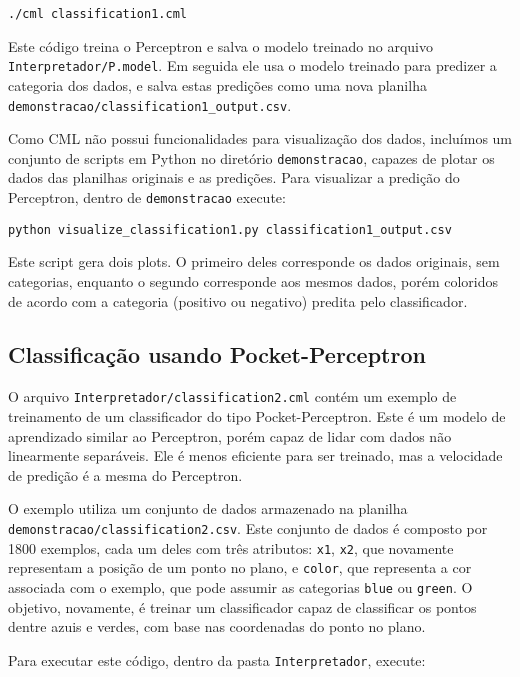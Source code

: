 \documentclass[12pt]{article}
\begin{document}
\begin{verbatim}
./cml classification1.cml
\end{verbatim}

Este código treina o Perceptron e salva o modelo treinado no arquivo \texttt{Interpretador/P.model}. Em seguida ele usa o modelo treinado para predizer a categoria dos dados, e salva estas predições como uma nova planilha \texttt{demonstracao/classification1\_output.csv}.

Como CML não possui funcionalidades para visualização dos dados, incluímos um conjunto de scripts em Python no diretório \texttt{demonstracao}, capazes de plotar os dados das planilhas originais e as predições. Para visualizar a predição do Perceptron, dentro de \texttt{demonstracao} execute:

\begin{verbatim}
python visualize_classification1.py classification1_output.csv
\end{verbatim}

Este script gera dois plots. O primeiro deles corresponde os dados originais, sem categorias, enquanto o segundo corresponde aos mesmos dados, porém coloridos de acordo com a categoria (positivo ou negativo) predita pelo classificador.

\subsection{Classificação usando Pocket-Perceptron}

O arquivo \texttt{Interpretador/classification2.cml} contém um exemplo de treinamento de um classificador do tipo Pocket-Perceptron. Este é um modelo de aprendizado similar ao Perceptron, porém capaz de lidar com dados não linearmente separáveis. Ele é menos eficiente para ser treinado, mas a velocidade de predição é a mesma do Perceptron.

O exemplo utiliza um conjunto de dados armazenado na planilha\\ \texttt{demonstracao/classification2.csv}. Este conjunto de dados é composto por 1800 exemplos, cada um deles com três atributos: \texttt{x1}, \texttt{x2}, que novamente representam a posição de um ponto no plano, e \texttt{color}, que representa a cor associada com o exemplo, que pode assumir as categorias \texttt{blue} ou \texttt{green}. O objetivo, novamente, é treinar um classificador capaz de classificar os pontos dentre azuis e verdes, com base nas coordenadas do ponto no plano. 

Para executar este código, dentro da pasta \texttt{Interpretador}, execute:
\end{document}

